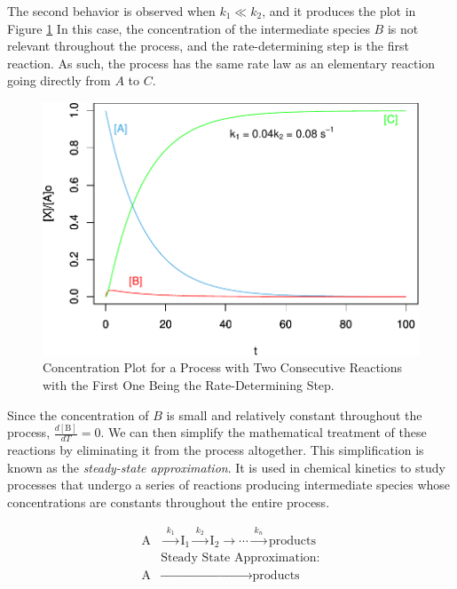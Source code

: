 \documentclass[
  9pt,
]{extbook}
\theoremstyle{definition}
\theoremstyle{definition}
\theoremstyle{definition}
\theoremstyle{remark}
\begin{document}
The second behavior is observed when \(k_1\ll k_2\), and it produces the plot in Figure \ref{fig:figk6} In this case, the concentration of the intermediate species \(B\) is not relevant throughout the process, and the rate-determining step is the first reaction. As such, the process has the same rate law as an elementary reaction going directly from \(A\) to \(C\).

\begin{figure}

{\centering \includegraphics{pchem1_files/figure-latex/figk6-1} 

}

\caption{Concentration Plot for a Process with Two Consecutive Reactions with the First One Being the Rate-Determining Step.}\label{fig:figk6}
\end{figure}

Since the concentration of \(B\) is small and relatively constant throughout the process, \(\frac{d[\mathrm{B}]}{dT}=0\). We can then simplify the mathematical treatment of these reactions by eliminating it from the process altogether. This simplification is known as the \emph{steady-state approximation}. It is used in chemical kinetics to study processes that undergo a series of reactions producing intermediate species whose concentrations are constants throughout the entire process.

\begin{equation}
\begin{aligned}
\text{A} &\xrightarrow{\;k_1\;} \text{I}_1 \xrightarrow{\;k_2\;} \text{I}_2 \xrightarrow{\quad} \cdots \xrightarrow{\;k_n\;}\text{products} \\
& \text{Steady State Approximation:} \\
\text{A}&\xrightarrow{\qquad\qquad\qquad\qquad\quad\quad\;\;}\text{products}
\end{aligned}
\label{eq:kincomp8}
\end{equation}
\end{document}
